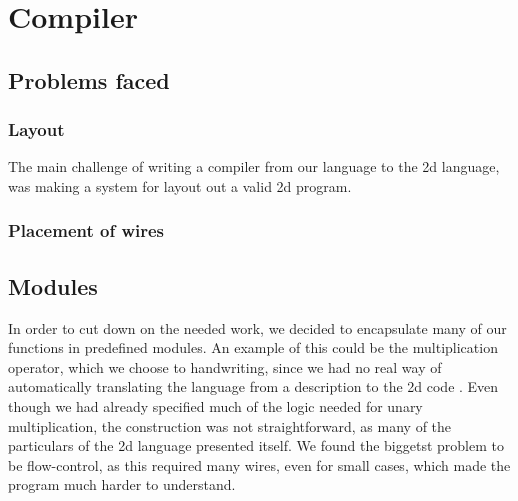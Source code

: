 \section{Compiler}
\label{compiler}

\subsection{Problems faced}
\label{compiler:problems}

\subsubsection{Layout}
\label{compiler:layout}
The main challenge of writing a compiler from our language to the 2d language, was making a system for layout out a valid 2d program. 

\subsubsection{Placement of wires}
\label{compiler:placement}


\subsection{Modules}
\label{compiler:modules}
In order to cut down on the needed work, we decided to encapsulate many of our functions in predefined modules. An example of this could be the multiplication operator, which we choose to handwriting, since we had no real way of automatically translating the language from a description to the 2d code . Even though we had already specified much of the logic needed for unary multiplication, the construction was not straightforward, as many of the particulars of the 2d language presented itself. We found the biggetst problem to be flow-control, as this required many wires, even for small cases, which made the program much harder to understand.

